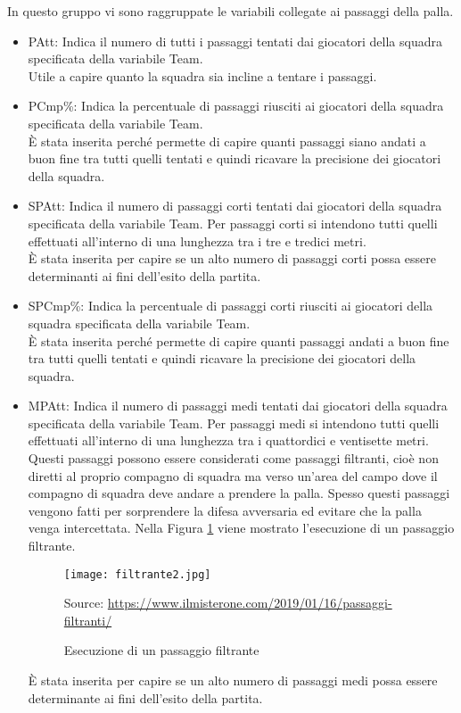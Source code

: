 In questo gruppo vi sono raggruppate le variabili collegate ai passaggi della palla.

\begin{itemize}
	
	
	\item \textsf{PAtt}: Indica il numero di tutti i passaggi tentati dai giocatori della squadra specificata della variabile \textsf{Team}. \\
	Utile a capire quanto la squadra sia incline a tentare i passaggi.
	
	\item\textsf{PCmp\%}: Indica la percentuale di passaggi riusciti ai giocatori della squadra specificata della variabile \textsf{Team}.\\ 
	È stata inserita perché permette di capire quanti passaggi siano andati a buon fine tra tutti quelli tentati e quindi ricavare la precisione dei giocatori della squadra.
	\item \textsf{SPAtt}: Indica il numero di passaggi corti tentati dai giocatori della squadra specificata della variabile \textsf{Team}. Per passaggi corti si intendono tutti quelli effettuati all'interno di una lunghezza tra i tre e tredici metri.\\
	È stata inserita per capire se un alto numero di passaggi corti possa essere determinanti ai fini dell'esito della partita. 
	
	\item \textsf{SPCmp\%}: Indica la percentuale di passaggi corti riusciti ai giocatori della squadra specificata della variabile \textsf{Team}. \\
	È stata inserita perché permette di capire quanti passaggi andati a buon fine tra tutti quelli tentati e quindi ricavare la precisione dei giocatori della squadra.
	
	\item \textsf{MPAtt}: Indica il numero di passaggi medi tentati dai giocatori della squadra specificata della variabile \textsf{Team}. Per passaggi medi si intendono tutti quelli effettuati all'interno di una lunghezza tra i quattordici e ventisette metri. Questi passaggi possono essere considerati come passaggi filtranti, cioè non diretti al proprio compagno di squadra ma verso un’area del campo dove il compagno di squadra deve andare a prendere la palla. Spesso questi passaggi vengono fatti per sorprendere la difesa avversaria ed evitare che la palla venga intercettata. Nella Figura \ref{fig:filt} viene mostrato l'esecuzione di un passaggio filtrante.\\
	\begin{figure}[ht]
		\begin{center}
			\texttt{[image: filtrante2.jpg]}
			\caption{Esecuzione di un passaggio filtrante} \label{fig:filt}
			Source: \url{https://www.ilmisterone.com/2019/01/16/passaggi-filtranti/}
		\end{center}
	\end{figure}
	È stata inserita per capire se un alto numero di passaggi medi possa essere determinante ai fini dell'esito della partita. 
	

\end{itemize}
